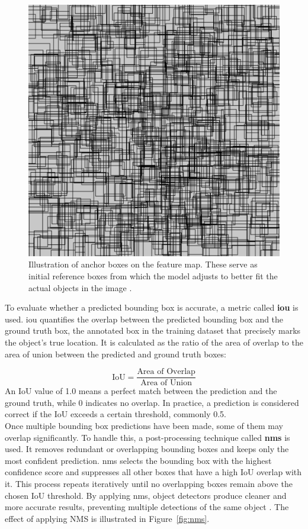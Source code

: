 \begin{figure}[h!]
    \centering
    \includegraphics[width=0.7\linewidth]{figures/theory/image-recognition/anchor-boxes.png}
    \caption[Anchor boxes in object detection]{Illustration of anchor boxes on the feature map. These serve as initial reference boxes from which the model adjusts to better fit the actual objects in the image \cite{thinkautonomous:anchorboxes}.}
    \label{fig:anchor-box}
\end{figure}

To evaluate whether a predicted bounding box is accurate, a metric called \textbf{\gls{iou}} is used. \gls{iou} quantifies the overlap between the predicted bounding box and the ground truth box, the annotated box in the training dataset that precisely marks the object's true location. It is calculated as the ratio of the area of overlap to the area of union between the predicted and ground truth boxes:

\[
\text{IoU} = \frac{\text{Area of Overlap}}{\text{Area of Union}}
\]
An IoU value of 1.0 means a perfect match between the prediction and the ground truth, while 0 indicates no overlap. In practice, a prediction is considered correct if the IoU exceeds a certain threshold, commonly 0.5. \\

 Once multiple bounding box predictions have been made, some of them may overlap significantly. To handle this, a post-processing technique called \textbf{\gls{nms}} is used. It removes redundant or overlapping bounding boxes and keeps only the most confident prediction. \gls{nms} selects the bounding box with the highest confidence score and suppresses all other boxes that have a high IoU overlap with it. This process repeats iteratively until no overlapping boxes remain above the chosen IoU threshold. By applying \gls{nms}, object detectors produce cleaner and more accurate results, preventing multiple detections of the same object
\cite{thepythoncode:nms}. The effect of applying NMS is illustrated in Figure~\ref{fig:nms}.

